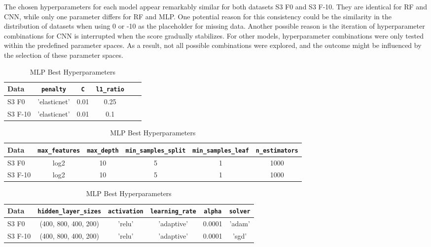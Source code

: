 \documentclass[a4paper,11pt]{report}
\begin{document}
The chosen hyperparameters for each model appear remarkably similar for both datasets S3 F0 and S3 F-10. They are identical for RF and CNN, while only one parameter differs for RF and MLP. One potential reason for this consistency could be the similarity in the distribution of datasets when using 0 or -10 as the placeholder for missing data. Another possible reason is the iteration of hyperparameter combinations for CNN is interrupted when the score gradually stabilizes. For other models, hyperparameter combinations were only tested within the predefined parameter spaces. As a result, not all possible combinations were explored, and the outcome might be influenced by the selection of these parameter spaces.

\begin{table}[H]
    \centering
    \caption{Best Hyperparameters}
    \begin{subtable}{\linewidth}
        \centering
        \caption{LR Best Hyperparameters}
        \label{table:lr_best_hyperparamters}
        \begin{tabular}{lccccc}
        \toprule
        \textbf{Data} & \verb|penalty| & \verb|C| & \verb|l1_ratio|  \\
        \midrule
        S3 F0 & 'elasticnet' & 0.01 & 0.25 \\
        S3 F-10 & 'elasticnet' & 0.01 & 0.1 \\ \bottomrule
        \end{tabular}
    \end{subtable}
    \bigskip
    
    \begin{subtable}{1.1\linewidth}
        \centering
        \caption{RF Best Hyperparameters}
        \label{table:rf_best_hyperparamters}
        \begin{tabular}{lccccc}
        \toprule
        \textbf{Data} & \verb|max_features| & \verb|max_depth| & \verb|min_samples_split| & \verb|min_samples_leaf| & \verb|n_estimators| \\
        \midrule
        S3 F0 & log2 & 10 & 5 & 1 & 1000 \\
        S3 F-10 & log2 & 10 & 5 & 1 & 1000 \\ \bottomrule
        \end{tabular}
    \end{subtable}
    \bigskip
    
    \begin{subtable}{\linewidth}
        \centering
        \caption{MLP Best Hyperparameters}
        \label{table:mlp_best_hyperparamters}
        \begin{tabular}{lccccc}
        \toprule
        \textbf{Data} & \verb|hidden_layer_sizes| & \verb|activation| & 
            \verb|learning_rate| & \verb|alpha| & \verb|solver|  \\
        \midrule
        S3 F0 & (400, 800, 400, 200) & 'relu' & 'adaptive' & 0.0001 & 'adam' \\
        S3 F-10 & (400, 800, 400, 200) & 'relu' & 'adaptive' & 0.0001 & 'sgd' \\ \bottomrule
        \end{tabular}
    \end{subtable}
    \bigskip
    

\end{table}
\end{document}
